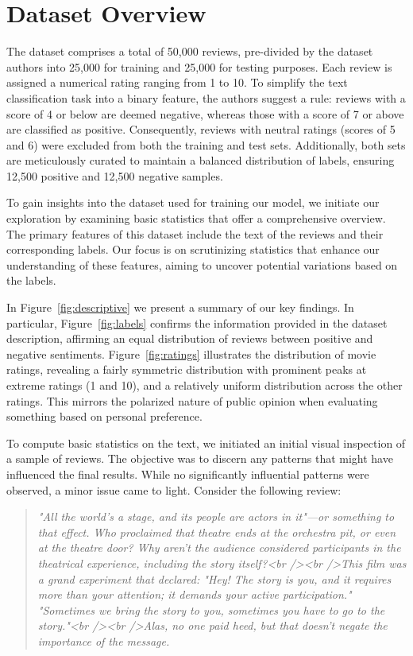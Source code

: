 \section{Dataset Overview}
\label{sec:eda}

The dataset comprises a total of 50,000 reviews, pre-divided by the dataset authors into 25,000 for training and 25,000 for testing purposes. Each review is assigned a numerical rating ranging from 1 to 10. To simplify the text classification task into a binary feature, the authors suggest a rule: reviews with a score of 4 or below are deemed negative, whereas those with a score of 7 or above are classified as positive. Consequently, reviews with neutral ratings (scores of 5 and 6) were excluded from both the training and test sets. Additionally, both sets are meticulously curated to maintain a balanced distribution of labels, ensuring 12,500 positive and 12,500 negative samples.

To gain insights into the dataset used for training our model, we initiate our exploration by examining basic statistics that offer a comprehensive overview. The primary features of this dataset include the text of the reviews and their corresponding labels. Our focus is on scrutinizing statistics that enhance our understanding of these features, aiming to uncover potential variations based on the labels.


In Figure~\ref{fig:descriptive} we present a summary of our key findings.
In particular, Figure~\ref{fig:labels} confirms the information provided in the dataset description, affirming an equal distribution of reviews between positive and negative sentiments. Figure~\ref{fig:ratings} illustrates the distribution of movie ratings, revealing a fairly symmetric distribution with prominent peaks at extreme ratings (1 and 10), and a relatively uniform distribution across the other ratings. This mirrors the polarized nature of public opinion when evaluating something based on personal preference.

To compute basic statistics on the text, we initiated an initial visual inspection of a sample of reviews. The objective was to discern any patterns that might have influenced the final results. While no significantly influential patterns were observed, a minor issue came to light. Consider the following review:

\begin{quote}
\textit{"All the world's a stage, and its people are actors in it"—or something to that effect. Who proclaimed that theatre ends at the orchestra pit, or even at the theatre door? Why aren't the audience considered participants in the theatrical experience, including the story itself?<br /><br />This film was a grand experiment that declared: "Hey! The story is you, and it requires more than your attention; it demands your active participation." "Sometimes we bring the story to you, sometimes you have to go to the story."<br /><br />Alas, no one paid heed, but that doesn't negate the importance of the message.}
\end{quote}

